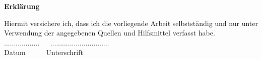 %
%
%
%
\thispagestyle{empty}
\setcounter{page}{0}
\noindent\textbf{Erklärung}

\noindent Hiermit versichere ich, dass ich die vorliegende Arbeit selbstständig und nur unter Verwendung der angegebenen Quellen und Hilfsmittel verfasst habe. 
$\ $\\
$\ $\\

\noindent ..................$\ \ \ \ \ \ \ $.............................. \\
\noindent Datum$\ \ \ \ \ \ \ \ \ \ \ \ \;$Unterschrift
\newpage
\thispagestyle{empty}
\mbox{}

%
